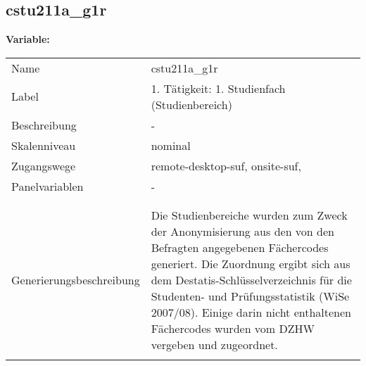 	
	
	\subsection{cstu211a\_g1r}
	\label{subSection:cstu211a_g1r}

	\noindent\textbf{Variable:}\\
		\begin{tabular}{lL{11.3cm}}
			\label{tableVariable:cstu211a_g1r}
			Name & cstu211a\_g1r \\
			Label & 1. Tätigkeit: 1. Studienfach (Studienbereich) \\
			Beschreibung & - \\
			Skalenniveau & nominal \\
			Zugangswege &
				remote-desktop-suf,
				onsite-suf,
 \\
			Panelvariablen & -
			 \\
			 \\
 \\
					Generierungsbeschreibung & Die Studienbereiche wurden zum Zweck der Anonymisierung aus den von den Befragten angegebenen Fächercodes generiert. Die Zuordnung ergibt sich aus dem Destatis-Schlüsselverzeichnis für die Studenten- und Prüfungsstatistik (WiSe 2007/08). Einige darin nicht enthaltenen Fächercodes wurden vom DZHW vergeben und zugeordnet. 
				 \\	
			 \\
		\end{tabular}






